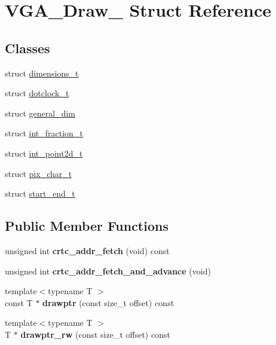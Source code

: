 \hypertarget{structVGA__Draw__2}{\section{V\-G\-A\-\_\-\-Draw\-\_ Struct Reference}
\label{structVGA__Draw__2}
}
\subsection*{Classes}
\begin{DoxyCompactItemize}
\item 
struct \hyperlink{structVGA__Draw__2_1_1dimensions__t}{dimensions\-\_\-t}
\item 
struct \hyperlink{structVGA__Draw__2_1_1dotclock__t}{dotclock\-\_\-t}
\item 
struct \hyperlink{structVGA__Draw__2_1_1general__dim}{general\-\_\-dim}
\item 
struct \hyperlink{structVGA__Draw__2_1_1int__fraction__t}{int\-\_\-fraction\-\_\-t}
\item 
struct \hyperlink{structVGA__Draw__2_1_1int__point2d__t}{int\-\_\-point2d\-\_\-t}
\item 
struct \hyperlink{structVGA__Draw__2_1_1pix__char__t}{pix\-\_\-char\-\_\-t}
\item 
struct \hyperlink{structVGA__Draw__2_1_1start__end__t}{start\-\_\-end\-\_\-t}
\end{DoxyCompactItemize}
\subsection*{Public Member Functions}
\begin{DoxyCompactItemize}
\item 
\hypertarget{structVGA__Draw__2_a2f033d7e2d7fff596bf9cc073e541050}{unsigned int {\bfseries crtc\-\_\-addr\-\_\-fetch} (void) const }\label{structVGA__Draw__2_a2f033d7e2d7fff596bf9cc073e541050}

\item 
\hypertarget{structVGA__Draw__2_a19586aafc913ed5f5861c3ed26550b53}{unsigned int {\bfseries crtc\-\_\-addr\-\_\-fetch\-\_\-and\-\_\-advance} (void)}\label{structVGA__Draw__2_a19586aafc913ed5f5861c3ed26550b53}

\item 
\hypertarget{structVGA__Draw__2_afe2ced5a197bbbddf894f964ab39742b}{{\footnotesize template$<$typename T $>$ }\\const T $\ast$ {\bfseries drawptr} (const size\-\_\-t offset) const }\label{structVGA__Draw__2_afe2ced5a197bbbddf894f964ab39742b}

\item 
\hypertarget{structVGA__Draw__2_a6b2bb438c612944e529d7bd1fd2983ad}{{\footnotesize template$<$typename T $>$ }\\T $\ast$ {\bfseries drawptr\-\_\-rw} (const size\-\_\-t offset) const }\label{structVGA__Draw__2_a6b2bb438c612944e529d7bd1fd2983ad}

\end{DoxyCompactItemize}
